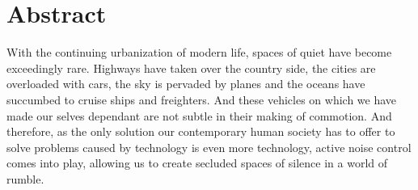 \chapter{\centering Abstract}

With the continuing urbanization of modern life, spaces of quiet have become exceedingly rare. Highways have taken over the country side, the cities are overloaded with cars, the sky is pervaded by planes and the oceans have succumbed to cruise ships and freighters. And these vehicles on which we have made our selves dependant are not subtle in their making of commotion.
And therefore, as the only solution our contemporary human society has to offer to solve problems caused by technology is even more technology, active noise control comes into play, allowing us to create secluded spaces of silence in a world of rumble.